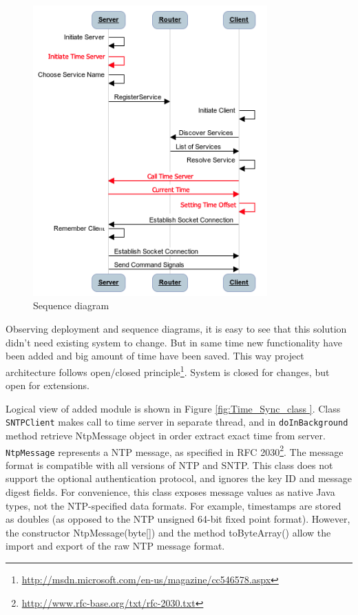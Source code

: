 \begin{figure}[H]
	\centering
		\includegraphics[width=9cm]{sprint5/communication}
	\caption{Sequence diagram}
	\label{fig:sprint5_sequence_diagram}
\end{figure}

Observing deployment and sequence diagrams, it is easy to see that this solution didn't need existing system to change. But in same time new functionality have been added and big amount of time have been saved. This way project architecture follows open/closed principle\footnote{\url{http://msdn.microsoft.com/en-us/magazine/cc546578.aspx}}. System is closed for changes, but open for extensions.

Logical view of added module is shown in Figure \ref{fig:Time_Sync_class }. Class \texttt{SNTPClient} makes call to time server in separate thread, and in \texttt{doInBackground} method retrieve NtpMessage object in order extract exact time from server. \texttt{NtpMessage} represents a NTP message, as specified in RFC 2030\footnote{\url{http://www.rfc-base.org/txt/rfc-2030.txt}}. The message format is compatible with all versions of NTP and SNTP. This class does not support the optional authentication protocol, and ignores the key ID and message digest fields. For convenience, this class exposes message values as native Java types, not the NTP-specified data formats. For example, timestamps are stored as doubles (as opposed to the NTP unsigned 64-bit fixed point format). However, the constructor NtpMessage(byte[]) and the method toByteArray() allow the import and export of the raw NTP message format.

